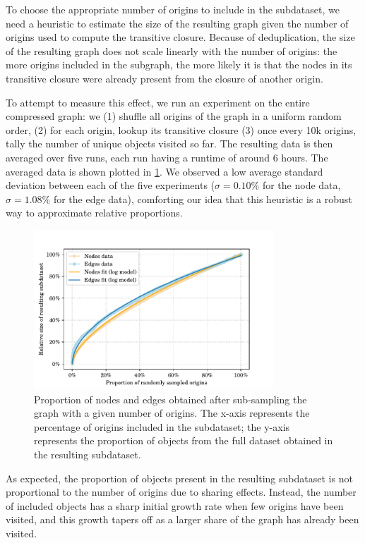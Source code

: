 To choose the appropriate number of origins to include in the subdataset, we
need a heuristic to estimate the size of the resulting graph given the number
of origins used to compute the transitive closure. Because of deduplication,
the size of the resulting graph does not scale linearly with the number of
origins: the more origins included in the subgraph, the more likely it is that
the nodes in its transitive closure were already present from the closure of
another origin.

To attempt to measure this effect, we run an experiment on the entire
compressed graph: we (1) shuffle all origins of the graph in a uniform
random order, (2) for each origin, lookup its transitive closure (3) once every
10k origins, tally the number of unique objects visited so far. The resulting
data is then averaged over five runs, each run having a runtime of around 6
hours.  The averaged data is shown plotted in
\cref{fig:subdataset-size-function}. We observed a low average standard
deviation between each of the five experiments ($\sigma = 0.10\%$ for the node
data, $\sigma = 1.08\%$ for the edge data), comforting our idea that this
heuristic is a robust way to approximate relative proportions.

\begin{figure}
    \centering
    \includegraphics[width=0.8\textwidth]{img/graph-exploitation/subdataset_size_function_fit}
    \caption{Proportion of nodes and edges obtained after sub-sampling the
        graph with a given number of origins. The x-axis represents the
        percentage of origins included in the subdataset; the y-axis represents
        the proportion of objects from the full dataset obtained in the
    resulting subdataset.}%
    \label{fig:subdataset-size-function}
\end{figure}

As expected, the proportion of objects present in the resulting subdataset is
not proportional to the number of origins due to sharing effects. Instead,
the number of included objects has a sharp initial growth rate when few origins
have been visited, and this growth tapers off as a larger share of the graph
has already been visited.

